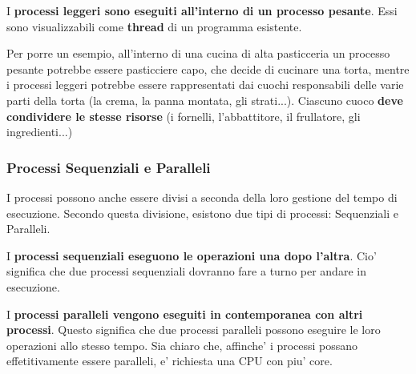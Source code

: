 \documentclass{article}
\begin{document}
{  I \textbf{processi leggeri sono eseguiti all'interno di un processo pesante}. Essi sono visualizzabili come \textbf{thread} di un programma esistente.

  Per porre un esempio, all'interno di una cucina di alta pasticceria un processo pesante potrebbe essere pasticciere capo, che decide di cucinare una torta, mentre i processi leggeri potrebbe essere rappresentati dai cuochi responsabili delle varie parti della torta (la crema, la panna montata, gli strati...). Ciascuno cuoco \textbf{deve condividere le stesse risorse} (i fornelli, l'abbattitore, il frullatore, gli ingredienti...)

  \subsubsection{Processi Sequenziali e Paralleli} %
  I processi possono anche essere divisi a seconda della loro gestione del tempo di esecuzione. Secondo questa divisione, esistono due tipi di processi: Sequenziali e Paralleli.

  I \textbf{processi sequenziali eseguono le operazioni una dopo l'altra}. Cio' significa che due processi sequenziali dovranno fare a turno per andare in esecuzione.

  I \textbf{processi paralleli vengono eseguiti in contemporanea con altri processi}. Questo significa che due processi paralleli possono eseguire le loro operazioni allo stesso tempo. Sia chiaro che, affinche' i processi possano effetitivamente essere paralleli, e' richiesta una CPU con piu' core.
 }

  \pagebreak
\end{document}
